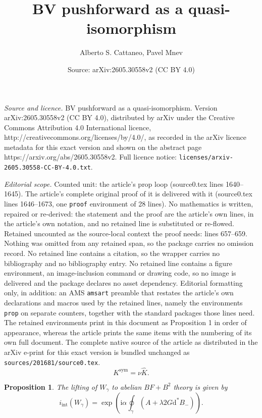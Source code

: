 \documentclass[10pt,a4paper]{amsart}
\title{BV pushforward as a quasi-isomorphism}
\author{Alberto S. Cattaneo, Pavel Mnev}
\date{Source: arXiv:2605.30558v2 (CC BY 4.0)}
\newtheorem{prop}{Proposition}
\newcommand{\dr}{\mathrm{d}}
\newcommand{\ii}{\mathrm{int}}
\newcommand{\iii}{\mathrm{i}}
\newcommand{\mr}{\mathrm}
\newcommand{\wh}{\widehat}
\begin{document}
\maketitle

\noindent\emph{Source and licence.} BV pushforward as a quasi-isomorphism. Version arXiv:2605.30558v2 (CC BY 4.0), distributed by arXiv under the Creative Commons Attribution 4.0 International licence, http://creativecommons.org/licenses/by/4.0/, as recorded in the arXiv licence metadata for this exact version and shown on the abstract page https://arxiv.org/abs/2605.30558v2. Full licence notice: \texttt{licenses/arxiv-2605.30558-CC-BY-4.0.txt}.\par\smallskip

\noindent\textit{Editorial scope.} Counted unit: the article's prop loop (source0.tex lines 1640--1645). The article's complete original proof of it is delivered with it (source0.tex lines 1646--1673, one \texttt{proof} environment of 28 lines). No mathematics is written, repaired or re-derived: the statement and the proof are the article's own lines, in the article's own notation, and no retained line is substituted or re-flowed.  Retained uncounted as the source-local context the proof needs: lines 657--659.  Nothing was omitted from any retained span, so the package carries no omission record.  No retained line contains a citation, so the wrapper carries no bibliography and no bibliography entry.  No retained line contains a figure environment, an image-inclusion command or drawing code, so no image is delivered and the package declares no asset dependency.  Editorial formatting only, in addition: an AMS \texttt{amsart} preamble that restates the article's own declarations and macros used by the retained lines, namely the environments \texttt{prop} on separate counters, together with the standard packages those lines need.  The retained environments print in this document as Proposition 1 in order of appearance, whereas the article prints the same items with the numbering of its own full document.  The complete native source of the article as distributed in the arXiv e-print for this exact version is bundled unchanged as \texttt{sources/201681/source0.tex}.
\begin{equation}\label{Ksym=nu whK}
    K^\mr{sym}=\nu \wh{K}.
\end{equation}

\begin{prop}\label{prop: lifting ab Wilson loop}
    The lifting of $W_\gamma$ to abelian $BF+B^2$ theory is given by
    \begin{equation}\label{ab BF+BB: i_int(W)}
        i_\ii(W_\gamma)=\exp \left(\iii\alpha \oint_\gamma (A+\lambda 2 G \dr^*B_-)\right).
    \end{equation}
\end{prop}
\end{document}

